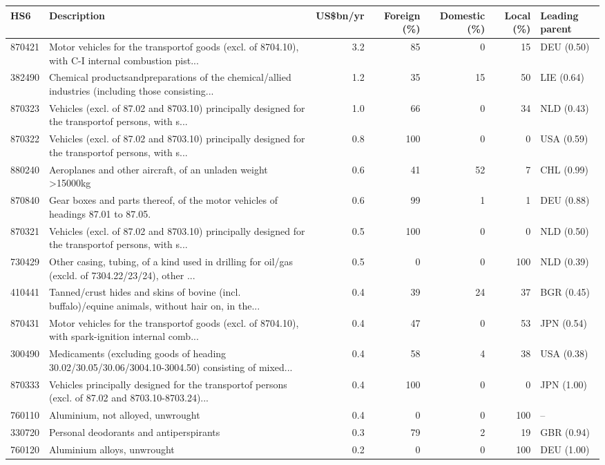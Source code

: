 \begin{tabular}{@{}l p{6.4cm} r r r r l@{}}
\toprule
HS6 & Description & US\$bn/yr & Foreign (\%) & Domestic (\%) & Local (\%) & Leading parent \\
\midrule
870421 & Motor vehicles for the transportof goods (excl. of 8704.10), with C-I internal combustion pist... & 3.2 & 85 & 0 & 15 & DEU (0.50) \\
382490 & Chemical productsandpreparations of the chemical/\allowbreak{}allied industries (including those consisting... & 1.2 & 35 & 15 & 50 & LIE (0.64) \\
870323 & Vehicles (excl. of 87.02 and 8703.10) principally designed for the transportof persons, with s... & 1.0 & 66 & 0 & 34 & NLD (0.43) \\
870322 & Vehicles (excl. of 87.02 and 8703.10) principally designed for the transportof persons, with s... & 0.8 & 100 & 0 & 0 & USA (0.59) \\
880240 & Aeroplanes and other aircraft, of an unladen weight >15000kg & 0.6 & 41 & 52 & 7 & CHL (0.99) \\
870840 & Gear boxes and parts thereof, of the motor vehicles of headings 87.01 to 87.05. & 0.6 & 99 & 1 & 1 & DEU (0.88) \\
870321 & Vehicles (excl. of 87.02 and 8703.10) principally designed for the transportof persons, with s... & 0.5 & 100 & 0 & 0 & NLD (0.50) \\
730429 & Other casing, tubing, of a kind used in drilling for oil/\allowbreak{}gas (excld. of 7304.22/\allowbreak{}23/\allowbreak{}24), other ... & 0.5 & 0 & 0 & 100 & NLD (0.39) \\
410441 & Tanned/\allowbreak{}crust hides and skins of bovine (incl. buffalo)/\allowbreak{}equine animals, without hair on, in the... & 0.4 & 39 & 24 & 37 & BGR (0.45) \\
870431 & Motor vehicles for the transportof goods (excl. of 8704.10), with spark-ignition internal comb... & 0.4 & 47 & 0 & 53 & JPN (0.54) \\
300490 & Medicaments (excluding goods of heading 30.02/\allowbreak{}30.05/\allowbreak{}30.06/\allowbreak{}3004.10-3004.50) consisting of mixed... & 0.4 & 58 & 4 & 38 & USA (0.38) \\
870333 & Vehicles principally designed for the transportof persons (excl. of 87.02 and 8703.10-8703.24)... & 0.4 & 100 & 0 & 0 & JPN (1.00) \\
760110 & Aluminium, not alloyed, unwrought & 0.4 & 0 & 0 & 100 & -- \\
330720 & Personal deodorants and antiperspirants & 0.3 & 79 & 2 & 19 & GBR (0.94) \\
760120 & Aluminium alloys, unwrought & 0.2 & 0 & 0 & 100 & DEU (1.00) \\
\bottomrule
\end{tabular}
